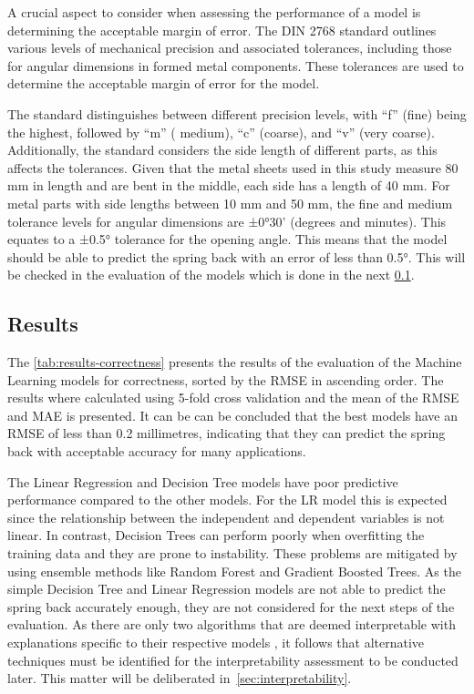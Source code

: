 A crucial aspect to consider when assessing the performance of a model is determining the acceptable margin of error.
The DIN 2768 standard outlines various levels of mechanical precision and associated tolerances, including those for
angular dimensions in formed metal components.
These tolerances are used to determine the acceptable margin of error for the model.

The standard distinguishes between different precision levels, with ``f'' (fine) being the highest, followed by ``m'' (
medium), ``c'' (coarse), and ``v'' (very coarse).
Additionally, the standard considers the side length of different parts, as this affects the tolerances.
Given that the metal sheets used in this study measure 80 mm in length and are bent in the middle, each side has a
length of 40 mm.
For metal parts with side lengths between 10 mm and 50 mm, the fine and medium tolerance levels for angular
dimensions are ±0°30' (degrees and minutes).
This equates to a ±0.5° tolerance for the opening angle.
This means that the model should be able to predict the spring back with an error of less than 0.5°.
This will be checked in the evaluation of the models which is done in the next \cref{subsec:results}.


\subsection{Results}\label{subsec:results}
The \cref{tab:results-correctness} presents the results of the evaluation of the Machine Learning models for
correctness, sorted by the RMSE in ascending order.
The results where calculated using 5-fold cross validation and the mean of the RMSE and MAE is presented.
It can be can be concluded that the best models have an RMSE of less than 0.2 millimetres, indicating that they can
predict the spring back with acceptable accuracy for many applications.

The Linear Regression and Decision Tree models have poor predictive performance compared to the other models.
For the \ac{LR} model this is expected since the relationship between the independent and dependent variables is
not linear.
In contrast, Decision Trees can perform poorly when overfitting the training data and they are prone to
instability.
These problems are mitigated by using ensemble methods like Random Forest and Gradient Boosted Trees.
As the simple Decision Tree and Linear Regression models are not able to predict the spring back accurately enough,
they are not considered for the next steps of the evaluation.
As there are only two algorithms that are deemed interpretable with explanations specific to their respective models
, it follows that alternative techniques must be identified for the interpretability assessment to be conducted later.
This matter will be deliberated in~\cref{sec:interpretability}.

